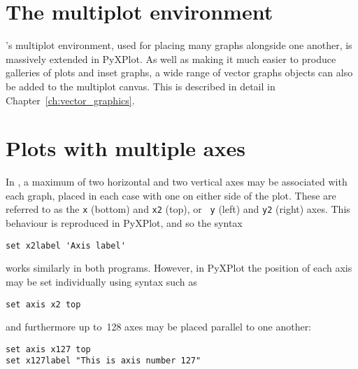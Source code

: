 \vspace{3mm}
\newline
{}
\vspace{3mm}\newline
{}\newline
{}\newline
{}
\vspace{3mm}

\section{The multiplot environment}

\gnuplot's multiplot environment, used for placing many graphs alongside one
another, is massively extended in PyXPlot.  As well as making it much easier to
produce galleries of plots and inset graphs, a wide range of vector graphs
objects can also be added to the multiplot canvas. This is described in detail
in Chapter~\ref{ch:vector_graphics}.

\section{Plots with multiple axes}

In \gnuplot, a maximum of two horizontal and two vertical axes may be
associated with each graph, placed in each case with one on either side of the
plot. These are referred to as the {\tt x} (bottom) and {\tt x2} (top), or {\tt
y} (left) and {\tt y2} (right) axes.  This behaviour is reproduced in PyXPlot,
and so the syntax

\begin{verbatim}
set x2label 'Axis label'
\end{verbatim}

\noindent works similarly in both programs. However, in PyXPlot the position of
each axis may be set individually using syntax such as

\begin{verbatim}
set axis x2 top
\end{verbatim}

\noindent and furthermore up to~128 axes may be placed parallel to one another:

\begin{verbatim}
set axis x127 top
set x127label "This is axis number 127"
\end{verbatim}

